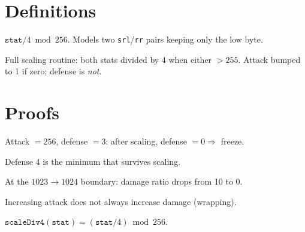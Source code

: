 \section{Definitions}

\begin{definition}\label{def:scale_div4}
  \leanok
  $\texttt{stat} / 4 \bmod 256$. Models two \texttt{srl}/\texttt{rr} pairs keeping only the low byte.
\end{definition}

\begin{definition}\label{def:stat_scaling}
  \leanok
  Full scaling routine: both stats divided by 4 when either $> 255$.
  Attack bumped to 1 if zero; defense is \emph{not}.
\end{definition}

\section{Proofs}

\begin{theorem}\label{thm:defense_zero_freeze}
  \leanok
  Attack $= 256$, defense $= 3$: after scaling, defense $= 0 \Rightarrow$ freeze.
\end{theorem}

\begin{theorem}\label{thm:defense_4_survives}
  \leanok
  Defense 4 is the minimum that survives scaling.
\end{theorem}

\begin{theorem}\label{thm:damage_cliff}
  \leanok
  At the $1023 \to 1024$ boundary: damage ratio drops from 10 to 0.
\end{theorem}

\begin{theorem}\label{thm:attack_not_monotone}
  \leanok
  Increasing attack does not always increase damage (wrapping).
\end{theorem}

\begin{theorem}\label{thm:scaling_mod256}
  \leanok
  $\texttt{scaleDiv4}(\texttt{stat}) = (\texttt{stat}/4) \bmod 256$.
\end{theorem}

